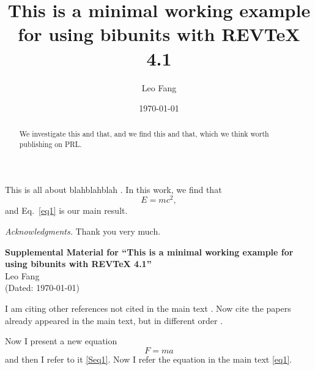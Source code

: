\documentclass[aps,prl,reprint,twocolumn,superscriptaddress,floatfix,letterpaper,longbibliography]{revtex4-1}
\begin{document}
\begin{bibunit}[apsrev4-1]
\title{This is a minimal working example for using bibunits with REVTeX 4.1}
\author{Leo Fang}
\date{\today}

\begin{abstract}
We investigate this and that, and we find this and that, which we think worth publishing on PRL.
\end{abstract}
\maketitle

This is all about blahblahblah \cite{Ref1, Ref2, Ref3}. In this work, we find that 
\begin{equation}
   E = mc^2, \label{eq1}
\end{equation}
and Eq.~\eqref{eq1} is our main result.

\emph{Acknowledgments.} Thank you very much.

\nocite{apsrev41Control}
\end{bibunit}

\widetext
\clearpage

\begin{bibunit}[apsrev4-1]

\renewcommand{\bibnumfmt}[1]{[S#1]}
\renewcommand{\citenumfont}[1]{S#1}
\renewcommand{\theequation}{S\arabic{equation}}
\renewcommand{\thefigure}{S\arabic{figure}}
\renewcommand{\thepage}{S\arabic{page}}  
\renewcommand{\thesection}{S\arabic{section}}   
\renewcommand{\thetable}{S\arabic{table}}
\setcounter{equation}{0}
\setcounter{figure}{0}
\setcounter{page}{1}
\setcounter{section}{0}

\begin{center}
	\textbf{\large Supplemental Material for ``This is a minimal working example for using bibunits with REVTeX 4.1''}\\
	\vspace{15pt}
	Leo Fang\\
	(Dated: \today)
\end{center}

I am citing other references not cited in the main text \cite{Ref4, Ref5}. Now cite the papers already appeared in the main text, but in different order \cite{Ref2, Ref1, Ref3}. 

Now I present a new equation
   \begin{equation}
      F=ma \label{Seq1}
   \end{equation}
and then I refer to it \eqref{Seq1}. Now I refer the equation in the main text \eqref{eq1}.

\nocite{apsrev41Control}
\end{bibunit}
\end{document}
